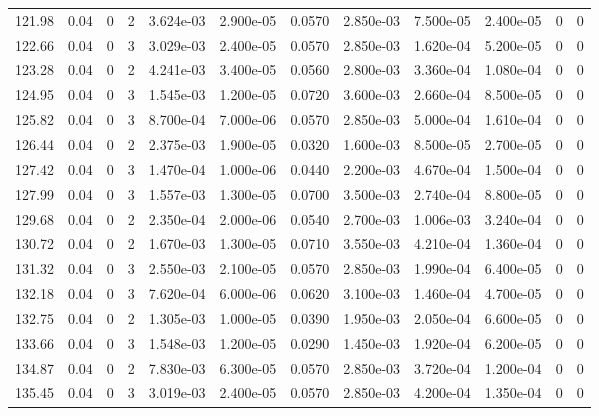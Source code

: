\documentclass[preview]{standalone}
\begin{document}
{{{{{\begin{tabular}{L{1.2cm}C{1.2cm} C{0.3cm}C{0.5cm} C{1.4cm}C{1.4cm} C{1.4cm}C{1.4cm} C{1.6cm}C{1.6cm} C{1.6cm}C{1.6cm}}
  121.98  &  0.04  & 0     &  2 &  3.624e-03  & 2.900e-05  &  0.0570&   2.850e-03& 7.500e-05 & 2.400e-05   &  0 & 0  \\ 
  122.66  &  0.04  & 0     &  3 &  3.029e-03  & 2.400e-05  &  0.0570&   2.850e-03& 1.620e-04 & 5.200e-05   &  0 & 0  \\ 
  123.28  &  0.04  & 0     &  2 &  4.241e-03  & 3.400e-05  &  0.0560&   2.800e-03& 3.360e-04 & 1.080e-04   &  0 & 0  \\ 
  124.95  &  0.04  & 0     &  3 &  1.545e-03  & 1.200e-05  &  0.0720&   3.600e-03& 2.660e-04 & 8.500e-05   &  0 & 0  \\ 
  125.82  &  0.04  & 0     &  3 &  8.700e-04  & 7.000e-06  &  0.0570&   2.850e-03& 5.000e-04 & 1.610e-04   &  0 & 0  \\ 
  126.44  &  0.04  & 0     &  2 &  2.375e-03  & 1.900e-05  &  0.0320&   1.600e-03& 8.500e-05 & 2.700e-05   &  0 & 0  \\ 
  127.42  &  0.04  & 0     &  3 &  1.470e-04  & 1.000e-06  &  0.0440&   2.200e-03& 4.670e-04 & 1.500e-04   &  0 & 0  \\ 
  127.99  &  0.04  & 0     &  3 &  1.557e-03  & 1.300e-05  &  0.0700&   3.500e-03& 2.740e-04 & 8.800e-05   &  0 & 0  \\ 
  129.68  &  0.04  & 0     &  2 &  2.350e-04  & 2.000e-06  &  0.0540&   2.700e-03& 1.006e-03 & 3.240e-04   &  0 & 0  \\ 
  130.72  &  0.04  & 0     &  2 &  1.670e-03  & 1.300e-05  &  0.0710&   3.550e-03& 4.210e-04 & 1.360e-04   &  0 & 0  \\ 
  131.32  &  0.04  & 0     &  3 &  2.550e-03  & 2.100e-05  &  0.0570&   2.850e-03& 1.990e-04 & 6.400e-05   &  0 & 0  \\ 
  132.18  &  0.04  & 0     &  3 &  7.620e-04  & 6.000e-06  &  0.0620&   3.100e-03& 1.460e-04 & 4.700e-05   &  0 & 0  \\ 
  132.75  &  0.04  & 0     &  2 &  1.305e-03  & 1.000e-05  &  0.0390&   1.950e-03& 2.050e-04 & 6.600e-05   &  0 & 0  \\ 
  133.66  &  0.04  & 0     &  3 &  1.548e-03  & 1.200e-05  &  0.0290&   1.450e-03& 1.920e-04 & 6.200e-05   &  0 & 0  \\ 
  134.87  &  0.04  & 0     &  2 &  7.830e-03  & 6.300e-05  &  0.0570&   2.850e-03& 3.720e-04 & 1.200e-04   &  0 & 0  \\ 
  135.45  &  0.04  & 0     &  3 &  3.019e-03  & 2.400e-05  &  0.0570&   2.850e-03& 4.200e-04 & 1.350e-04   &  0 & 0  \\ 
\hline 
\end{tabular} 

}}}}}
\end{document}
